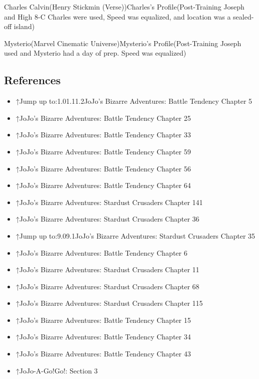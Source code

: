 \documentclass[a4paper,12pt]{article}
\begin{document}
Charles Calvin(Henry Stickmin (Verse))Charles's Profile(Post-Training Joseph and High 8-C Charles were used, Speed was equalized, and location was a sealed-off island)\\ \par \vspace{0.5cm}

Mysterio(Marvel Cinematic Universe)Mysterio's Profile(Post-Training Joseph used and Mysterio had a day of prep. Speed was equalized)\\ \par \vspace{0.5cm}

\subsection*{References}\n\n\begin{itemize}
\item ↑Jump up to:1.01.11.2JoJo's Bizarre Adventures: Battle Tendency Chapter 5
\item ↑JoJo's Bizarre Adventures: Battle Tendency Chapter 25
\item ↑JoJo's Bizarre Adventures: Battle Tendency Chapter 33
\item ↑JoJo's Bizarre Adventures: Battle Tendency Chapter 59
\item ↑JoJo's Bizarre Adventures: Battle Tendency Chapter 56
\item ↑JoJo's Bizarre Adventures: Battle Tendency Chapter 64
\item ↑JoJo's Bizarre Adventures: Stardust Crusaders Chapter 141
\item ↑JoJo's Bizarre Adventures: Stardust Crusaders Chapter 36
\item ↑Jump up to:9.09.1JoJo's Bizarre Adventures: Stardust Crusaders Chapter 35
\item ↑JoJo's Bizarre Adventures: Battle Tendency Chapter 6
\item ↑JoJo's Bizarre Adventures: Stardust Crusaders Chapter 11
\item ↑JoJo's Bizarre Adventures: Stardust Crusaders Chapter 68
\item ↑JoJo's Bizarre Adventures: Stardust Crusaders Chapter 115
\item ↑JoJo's Bizarre Adventures: Battle Tendency Chapter 15
\item ↑JoJo's Bizarre Adventures: Battle Tendency Chapter 34
\item ↑JoJo's Bizarre Adventures: Battle Tendency Chapter 43
\item ↑JoJo-A-Go!Go!: Section 3

\end{itemize}
\end{document}
